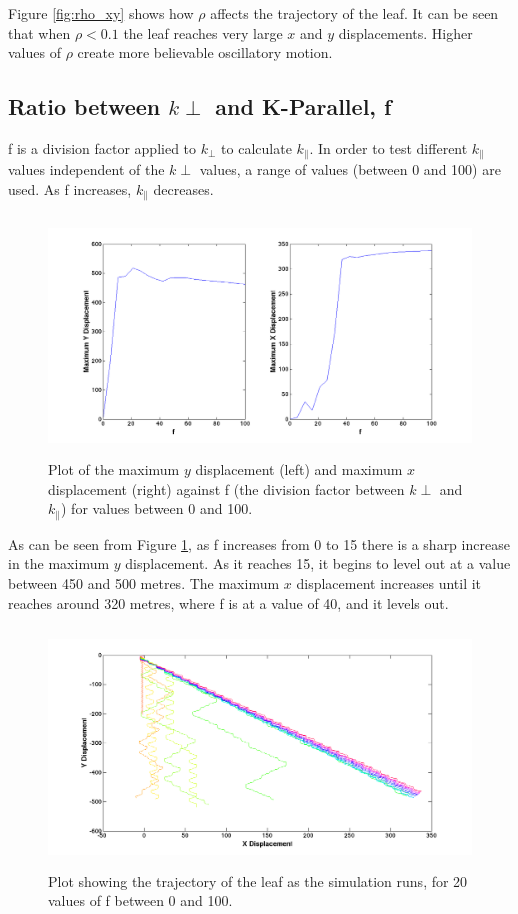 \noindent Figure \ref{fig:rho_xy} shows how $\rho$ affects the trajectory of the leaf. It can be seen that when $\rho < 0.1$ the leaf reaches very large $x$ and $y$ displacements. Higher values of $\rho$ create more believable oscillatory motion. 

\subsection{Ratio between $k{\perp}$ and K-Parallel, f}

f is a division factor applied to $k_{\perp}$ to calculate $k_{\parallel}$. In order to test different $k_{\parallel}$ values independent of the $k{\perp}$ values, a range of values (between 0 and 100) are used. As f increases, $k_{\parallel}$ decreases. 

\begin{figure}[H]
	\centering
	\includegraphics[width=1\textwidth, height=2.5in]{Motion_Graphs/f_max.png}
	\caption{Plot of the maximum $y$ displacement (left) and maximum $x$ displacement (right) against f (the division factor between $k{\perp}$ and $k_{\parallel}$) for values between 0 and 100. }\label{fig:fmax}
\end{figure}

\noindent As can be seen from Figure \ref{fig:fmax}, as f increases from 0 to 15 there is a sharp increase in the maximum $y$ displacement. As it reaches 15, it begins to level out at a value between 450 and 500 metres. The maximum $x$ displacement increases until it reaches around 320 metres, where f is at a value of 40, and it levels out.

\begin{figure}[H]
	\centering
	\includegraphics[width=1\linewidth, height=2.5in]{Motion_Graphs/f_xy.png}
	\caption{Plot showing the trajectory of the leaf as the simulation runs, for 20 values of f between 0 and 100. }\label{fig:f_xy}
\end{figure}

